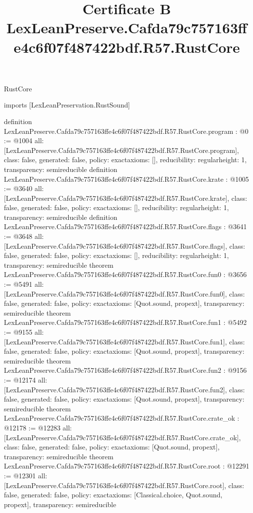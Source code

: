 \begin{lexlean}{RustCore}
\title{Certificate B LexLeanPreserve.Cafda79c757163ffe4c6f07f487422bdf.R57.RustCore}
\begin{coremodule}
imports [LexLeanPreservation.RustSound]

definition LexLeanPreserve.Cafda79c757163ffe4c6f07f487422bdf.R57.RustCore.program : @0 := @1004 {
  all: [LexLeanPreserve.Cafda79c757163ffe4c6f07f487422bdf.R57.RustCore.program],
  class: false,
  generated: false,
  policy: exact{axioms: []},
  reducibility: regular{height: 1},
  transparency: semireducible
}
definition LexLeanPreserve.Cafda79c757163ffe4c6f07f487422bdf.R57.RustCore.krate : @1005 := @3640 {
  all: [LexLeanPreserve.Cafda79c757163ffe4c6f07f487422bdf.R57.RustCore.krate],
  class: false,
  generated: false,
  policy: exact{axioms: []},
  reducibility: regular{height: 1},
  transparency: semireducible
}
definition LexLeanPreserve.Cafda79c757163ffe4c6f07f487422bdf.R57.RustCore.flags : @3641 := @3648 {
  all: [LexLeanPreserve.Cafda79c757163ffe4c6f07f487422bdf.R57.RustCore.flags],
  class: false,
  generated: false,
  policy: exact{axioms: []},
  reducibility: regular{height: 1},
  transparency: semireducible
}
theorem LexLeanPreserve.Cafda79c757163ffe4c6f07f487422bdf.R57.RustCore.fun0 : @3656 := @5491 {
  all: [LexLeanPreserve.Cafda79c757163ffe4c6f07f487422bdf.R57.RustCore.fun0],
  class: false,
  generated: false,
  policy: exact{axioms: [Quot.sound, propext]},
  transparency: semireducible
}
theorem LexLeanPreserve.Cafda79c757163ffe4c6f07f487422bdf.R57.RustCore.fun1 : @5492 := @9155 {
  all: [LexLeanPreserve.Cafda79c757163ffe4c6f07f487422bdf.R57.RustCore.fun1],
  class: false,
  generated: false,
  policy: exact{axioms: [Quot.sound, propext]},
  transparency: semireducible
}
theorem LexLeanPreserve.Cafda79c757163ffe4c6f07f487422bdf.R57.RustCore.fun2 : @9156 := @12174 {
  all: [LexLeanPreserve.Cafda79c757163ffe4c6f07f487422bdf.R57.RustCore.fun2],
  class: false,
  generated: false,
  policy: exact{axioms: [Quot.sound, propext]},
  transparency: semireducible
}
theorem LexLeanPreserve.Cafda79c757163ffe4c6f07f487422bdf.R57.RustCore.crate_ok : @12178 := @12283 {
  all: [LexLeanPreserve.Cafda79c757163ffe4c6f07f487422bdf.R57.RustCore.crate_ok],
  class: false,
  generated: false,
  policy: exact{axioms: [Quot.sound, propext]},
  transparency: semireducible
}
theorem LexLeanPreserve.Cafda79c757163ffe4c6f07f487422bdf.R57.RustCore.root : @12291 := @12301 {
  all: [LexLeanPreserve.Cafda79c757163ffe4c6f07f487422bdf.R57.RustCore.root],
  class: false,
  generated: false,
  policy: exact{axioms: [Classical.choice, Quot.sound, propext]},
  transparency: semireducible
}


\end{coremodule}
\end{lexlean}
